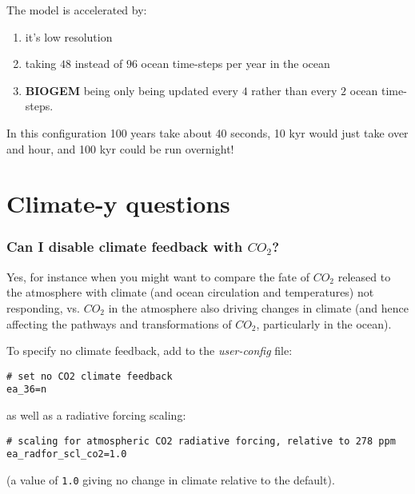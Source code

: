 \documentclass[11pt,fleqn]{book} %
\begin{document}
The model is accelerated by:

\begin{enumerate}[noitemsep]
\setlength{\itemindent}{.2in}
\item it's low resolution
\item taking \(48\) instead of \(96\) ocean time-steps per year in the ocean
\item \textbf{BIOGEM} being only being updated every \(4\) rather than every \(2\) ocean time-steps.
\end{enumerate}

In this configuration 100 years take about 40 seconds, 10 kyr would just take over and hour, and 100 kyr could be run overnight!


\newpage


\section{Climate-y questions}

%
\subsubsection{Can I disable climate feedback with \(CO_{2}\)?}

Yes, for instance when you might want to compare the fate of \(CO_{2}\) released to the atmosphere with climate (and ocean circulation and temperatures) not responding, vs. \(CO_{2}\) in the atmosphere also driving changes in climate (and hence affecting the pathways and transformations of \(CO_{2}\), particularly in the ocean).

\vspace{2mm}
To specify no climate feedback, add to the \textit{user-config} file:
\vspace{-2mm}\small\begin{verbatim}
# set no CO2 climate feedback
ea_36=n
\end{verbatim}\normalsize\vspace{-2mm}
as well as a radiative forcing scaling:
\vspace{-2mm}\small\begin{verbatim}
# scaling for atmospheric CO2 radiative forcing, relative to 278 ppm
ea_radfor_scl_co2=1.0
\end{verbatim}\normalsize\vspace{-2mm}
(a value of \texttt{1.0} giving no change in climate relative to the default).
\end{document}
